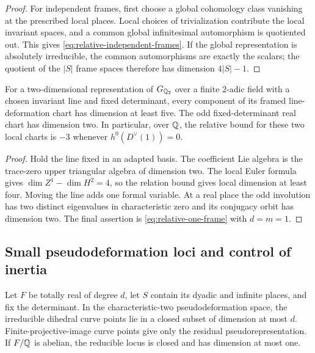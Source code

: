 \begin{proof}
For independent frames, first choose a global cohomology class
vanishing at the prescribed local places.  Local choices of
trivialization contribute the local invariant spaces, and a common
global infinitesimal automorphism is quotiented out.  This gives
\eqref{eq:relative-independent-frames}.  If the global representation
is absolutely irreducible, the common automorphisms are exactly the
scalars; the quotient of the $|S|$ frame spaces therefore has
dimension $4|S|-1$.
\end{proof}

\begin{corollary}
\label{cor:charzero-line-dimension}
For a two-dimensional representation of $G_{\mathbb Q_2}$ over a finite
$2$-adic field with a chosen invariant line and fixed determinant,
every component of its framed line-deformation chart has dimension
at least five.  The odd fixed-determinant real chart has dimension
two.  In particular, over $\mathbb Q$, the relative bound for these two
local charts is $-3$ whenever $h^0(D^\vee(1))=0$.
\end{corollary}

\begin{proof}
Hold the line fixed in an adapted basis.  The coefficient Lie algebra
is the trace-zero upper triangular algebra of dimension two.  The
local Euler formula gives
$\dim Z^1-\dim H^2=4$, so the relation bound gives local dimension
at least four.  Moving the line adds one formal variable.  At a real
place the odd involution has two distinct eigenvalues in
characteristic zero and its conjugacy orbit has dimension two.
The final assertion is \eqref{eq:relative-one-frame} with $d=m=1$.
\end{proof}

\subsection{Small pseudodeformation loci and control of inertia}

\begin{lemma}\label{lem:pseudo-bad-loci}
Let $F$ be totally real of degree $d$, let $S$ contain its dyadic and
infinite places, and fix the determinant.  In the characteristic-two
pseudodeformation space, the irreducible dihedral curve points lie in
a closed subset of dimension at most $d$.  Finite-projective-image
curve points give only the residual pseudorepresentation.  If
$F/\mathbb Q$ is abelian, the reducible locus is closed and has dimension
at most one.
\end{lemma}

